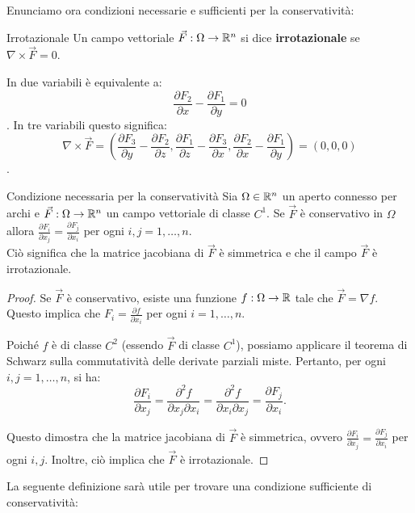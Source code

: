 Enunciamo ora condizioni necessarie e sufficienti per la conservatività:


\begin{definizione}{Irrotazionale}
  Un campo vettoriale $\vec F: \Omega \rightarrow \mathbb{R}^n$ si dice \textbf{irrotazionale} se $\nabla \times \vec F = 0$. \\
\end{definizione}
In due variabili è equivalente a:
$$\frac{\partial F_2}{\partial x} - \frac{\partial F_1}{\partial y}=0$$.
In tre variabili questo significa:
$$\nabla \times \vec F = \left( \frac{\partial F_3}{\partial y} - \frac{\partial F_2}{\partial z}, \frac{\partial F_1}{\partial z} - \frac{\partial F_3}{\partial x}, \frac{\partial F_2}{\partial x} - \frac{\partial F_1}{\partial y} \right) = (0,0,0)$$.

\begin{teorema}{Condizione necessaria per la conservatività}
  Sia $\Omega \in \mathbb{R}^n$ un aperto connesso per archi e $\vec F: \Omega \rightarrow \mathbb{R}^n$ un campo vettoriale di classe $C^1$. Se $\vec F$ è conservativo in $\Omega$ allora $\frac{\partial F_i}{\partial x_j} = \frac{\partial F_j}{\partial x_i}$ per ogni $i,j = 1, \ldots, n$. \\
  Ciò significa che la matrice jacobiana di $\vec F$ è simmetrica e che il campo $\vec F$ è irrotazionale.
\end{teorema}

\begin{proof}
  Se $\vec F$ è conservativo, esiste una funzione $f: \Omega \rightarrow \mathbb{R}$ tale che $\vec F = \nabla f$. Questo implica che $F_i = \frac{\partial f}{\partial x_i}$ per ogni $i = 1, \ldots, n$.

  Poiché $f$ è di classe $C^2$ (essendo $\vec F$ di classe $C^1$), possiamo applicare il teorema di Schwarz sulla commutatività delle derivate parziali miste. Pertanto, per ogni $i, j = 1, \ldots, n$, si ha:
  $$ \frac{\partial F_i}{\partial x_j} = \frac{\partial^2 f}{\partial x_j \partial x_i} = \frac{\partial^2 f}{\partial x_i \partial x_j} = \frac{\partial F_j}{\partial x_i}. $$

  Questo dimostra che la matrice jacobiana di $\vec F$ è simmetrica, ovvero $\frac{\partial F_i}{\partial x_j} = \frac{\partial F_j}{\partial x_i}$ per ogni $i, j$. Inoltre, ciò implica che $\vec F$ è irrotazionale.
\end{proof}



La seguente definizione sarà utile per trovare una condizione sufficiente di conservatività:

